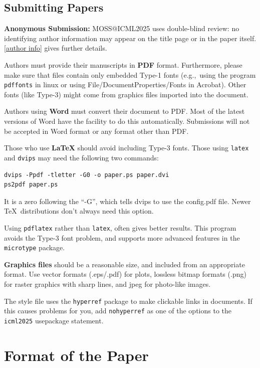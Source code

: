 \documentclass{article}
\theoremstyle{plain}
\theoremstyle{definition}
\theoremstyle{remark}
\begin{document}
\subsection{Submitting Papers}

\textbf{Anonymous Submission:} MOSS@ICML2025 uses double-blind review: no identifying
author information may appear on the title page or in the paper
itself. \cref{author info} gives further details.

\medskip

Authors must provide their manuscripts in \textbf{PDF} format.
Furthermore, please make sure that files contain only embedded Type-1 fonts
(e.g.,~using the program \texttt{pdffonts} in linux or using
File/DocumentProperties/Fonts in Acrobat). Other fonts (like Type-3)
might come from graphics files imported into the document.

Authors using \textbf{Word} must convert their document to PDF\@. Most
of the latest versions of Word have the facility to do this
automatically. Submissions will not be accepted in Word format or any
format other than PDF\@. 

Those who use \textbf{\LaTeX} should avoid including Type-3 fonts.
Those using \texttt{latex} and \texttt{dvips} may need the following
two commands:

{\footnotesize
\begin{verbatim}
dvips -Ppdf -tletter -G0 -o paper.ps paper.dvi
ps2pdf paper.ps
\end{verbatim}}
It is a zero following the ``-G'', which tells dvips to use
the config.pdf file. Newer \TeX\ distributions don't always need this
option.

Using \texttt{pdflatex} rather than \texttt{latex}, often gives better
results. This program avoids the Type-3 font problem, and supports more
advanced features in the \texttt{microtype} package.

\textbf{Graphics files} should be a reasonable size, and included from
an appropriate format. Use vector formats (.eps/.pdf) for plots,
lossless bitmap formats (.png) for raster graphics with sharp lines, and
jpeg for photo-like images.

The style file uses the \texttt{hyperref} package to make clickable
links in documents. If this causes problems for you, add
\texttt{nohyperref} as one of the options to the \texttt{icml2025}
usepackage statement.


\section{Format of the Paper}
\end{document}
